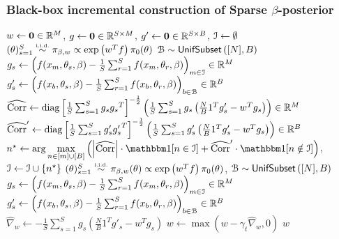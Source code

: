 \documentclass[hyperref={colorlinks = true},unknownkeysallowed]{beamer}
\begin{document}
\begin{frame}
	\frametitle{Black-box incremental construction of Sparse $\beta$-posterior}
	\vspace{-0.5cm}
	\scriptsize 
	\begin{algorithmic}[1]
		\State $w \leftarrow \mathbf{0} \in \mathbb{R}^{M}$,\;\; $g \leftarrow \mathbf{0} \in \mathbb{R}^{S \times M}$, \;\;$g' \leftarrow \mathbf{0} \in \mathbb{R}^{S \times B}$, \;\;$\mathcal{I} \leftarrow \emptyset$
		\State $(\theta)_{s=1}^{S}  \distiid \pi_{\beta,w} \propto \exp \left(w^Tf\right) \pi_0(\theta)$ 
		\State $\mathcal{B}\sim{\sf{UnifSubset}}\left([N], B\right)$
		\State $g_{s} \gets \left( f(x_m, \theta_s, \beta ) - \frac{1}{S}\sum_{r=1}^S f(x_m, \theta_{r}, \beta) \right)_{m \in \mathcal{I}}\in \mathbb{R}^M$ 
		\State  $g'_{s} \gets \left( f(x_b, \theta_s, \beta) - \frac{1}{S}\sum_{r=1}^S f(x_b, \theta_{r}, \beta) \right)_{b\in\mathcal{B}} \in \mathbb{R}^B$
		\State $\widehat{\operatorname{Corr}} \leftarrow \operatorname{diag} \left[ \frac{1}{S} \sum_{s=1}^{S} g_{s}
		{g_{s}}^T\right]^{-\frac{1}{2}} \left(\frac{1}{S} \sum_{s=1}^{S} g_{s} \left(\frac{N}{B}1^T g'_{s} - w^T g_{s}\right)\right) \in \mathbb{R}^{M}$
		\label{lst:line:core-corr}
		\State $\widehat{\operatorname{Corr}}' \leftarrow \operatorname{diag} \left[ \frac{1}{S} \sum_{s=1}^{S} g'_{s}
		{g'_{s}}^T\right]^{-\frac{1}{2}} \left(\frac{1}{S} \sum_{s=1}^{S} g'_{s} \left(\frac{N}{B}1^T g'_{s} - w^T g_{s}\right)\right)  \in \mathbb{R}^{B}$
		\label{lst:line:batch-corr}
		\State $n^{\star} \assign \arg \underset{n \in [m] \cup [B]}{\max} \left( \left|\hcorr \right| \cdot \vecone[n \in \mcI] + \hcorr' \cdot \vecone [n \notin \mcI]\right)$, \;\;$ \mathcal{I} \leftarrow \mathcal{I} \cup \{n^{\star}\}$
		\State $(\theta)_{s=1}^{S}  \distiid \pi_{\beta,w}(\theta) \propto \exp\left(w^T f\right)\pi_0(\theta)$, $\mathcal{B}\sim{\sf{UnifSubset}}\left([N], B\right)$
		\State $g_{s} \gets \left( f(x_m, \theta_s, \beta) - \frac{1}{S}\sum_{r=1}^S f(x_m, \theta_{r}, \beta) \right)_{m\in\mathcal{I}} \in \mathbb{R}^M$  	
		\State $g'_{s} \gets \left( f(x_b, \theta_s, \beta) - \frac{1}{S}\sum_{r=1}^S f(x_b, \theta_{r}, \beta) \right)_{b\in\mathcal{B}} \in \mathbb{R}^B$  	
		\EndFor
		\State $\hat\nabla_w \gets -\frac{1}{S}\sum_{s=1}^S g_s\left( \frac{N}{B} 1^Tg'_s- w^Tg_s\right)$
		\State $w \gets \max(w - \gamma_t\hat\nabla_w, 0)$
		\EndFor
		\EndFor
		\State\Return $w$%
		\EndProcedure		 
	\end{algorithmic}
\normalsize
\end{frame}
\end{document}
